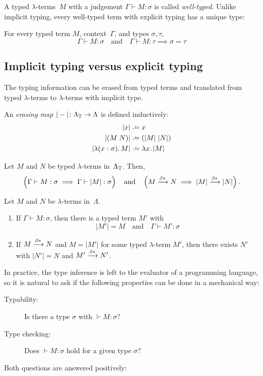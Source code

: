 A typed $\lambda$-terms~$M$ with a judgement $\Gamma \vdash M : \sigma$ is
called \emph{well-typed}.  Unlike implicit typing, every well-typed term with
explicit typing has a unique type:
\begin{proposition}
  For every typed term $M$, context~$\Gamma$, and types $\sigma, \tau$, 
  \[
    \Gamma \vdash M : \sigma
    \quad\text{and}\quad
    \Gamma \vdash M : \tau
    \implies
    \sigma = \tau
  \]
\end{proposition}

\subsection{Implicit typing versus explicit typing}
The typing information can be erased from typed terms and translated
from typed $\lambda$-terms to $\lambda$-terms with implicit type.
\begin{definition}
  An \emph{erasing map} $|-|\colon \Lambda_{\mathbb{T}} \to \Lambda$ is defined
  inductively:
  \begin{align*}
    |x| & \defeq x \\
    |(M\; N)| & \defeq (|M|\;|N|) \\
    |\lambda (x:\sigma).\, M| & \defeq \lambda x.\, |M|
  \end{align*}
\end{definition}
\begin{proposition}
  Let $M$ and $N$ be typed $\lambda$-terms in~$\Lambda_{\mathbb{T}}$. Then, 
  \[
    \left(\Gamma \vphantom{\reduce} \vdash M : \sigma \implies \Gamma \vdash |M| : \sigma\right)
    \quad\text{and}\quad \left(M \reduce N \implies |M| \reduce |N|\right).
  \]
\end{proposition}
\begin{proposition}
  Let $M$ and $N$ be $\lambda$-terms in~$\Lambda$. 
  \begin{enumerate}
    \item If $\Gamma \vdash M : \sigma$, then there is a typed term $M'$ with 
      \[
        |M'| = M
        \quad\text{and}\quad
        \Gamma \vdash M' : \sigma
      \]
    \item If $M \xrightarrow{\beta*} N$ and $M = |M'|$ for some typed $\lambda$-term $M'$,
      then there exists $N'$ with $|N'| = N$ and $M' \xrightarrow{\beta*} N'$.
    \end{enumerate}
\end{proposition}

In practice, the type inference is left to the evaluator of a programming
language, so it is natural to ask if the following properties can be done
in a mechanical way:
\begin{description}
  \item[Typability:] Is there a type $\sigma$ with $\vdash M : \sigma$? 
  \item[Type checking:] Does $\vdash M : \sigma$ hold for a given type $\sigma$?
  \end{description}
Both questions are answered positively:

